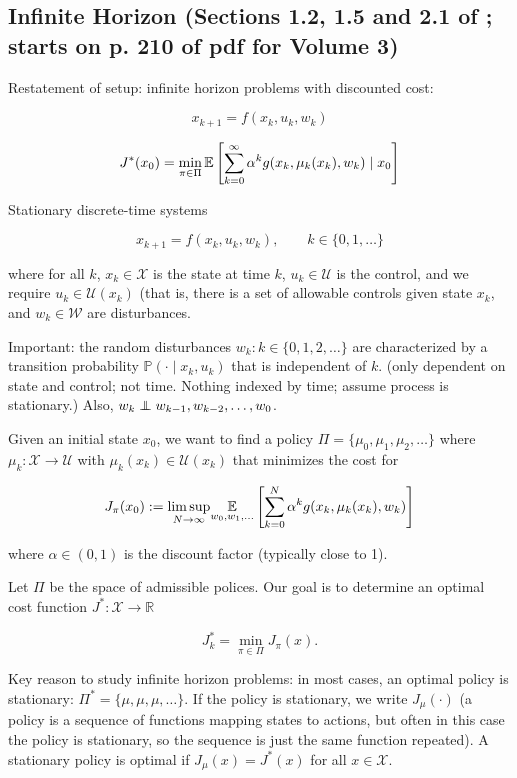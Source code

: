 \subsection{Infinite Horizon (Sections 1.2, 1.5 and 2.1 of \citet{v2_bertsekas2012dynamic}; starts on p. 210 of pdf for Volume 3)}\label{statlearning.inf.horizon}

Restatement of setup: infinite horizon problems with discounted cost:

\[
x_{k+1} = f(x_k, u_k, w_k) 
\]

\[
J^*(x_0) = \min_{\pi \in \Pi} \mathbb{E} \left[ \sum_{k=0}^\infty \alpha^k g(x_k, \mu_k(x_k), w_k)  \mid x_0\right]
\]


Stationary discrete-time systems 

\[
x_{k+1} = f(x_k, u_k, w_k), \qquad k \in \{0, 1, \ldots\}
\]

where for all \(k\), \(x_k \in \mathcal{X}\) is the state at time \(k\), \(u_k \in \mathcal{U}\) is the control, and we require \(u_k \in \mathcal{U}(x_k)\) (that is, there is a set of allowable controls given state \(x_k\), and \(w_k \in \mathcal{W}\) are disturbances.

Important: the random disturbances \(w_k: k \in \{0, 1, 2, \ldots\}\) are characterized by a transition probability \(\mathbb{P}(\cdot \mid x_k, u_k)\) that is independent of \(k\). (only dependent on state and control; not time. Nothing indexed by time; assume process is stationary.) Also, \(w_k \indep w_{k-1}, w_{k-2}, \ldots, w_0\).

Given an initial state \(x_0\), we want to find a policy \(\Pi = \{\mu_0, \mu_1, \mu_2, \ldots \}\) where \(\mu_k : \mathcal{X} \to \mathcal{U}\) with \(\mu_k(x_k) \in \mathcal{U}(x_k)\) that minimizes the cost for

\[
J_\pi(x_0) := \underset{N \to \infty}{ \lim \sup} \underset{w_0, w_1, \ldots}{\mathbb{E}} \left[  \sum_{k=0}^N \alpha^k g(x_k, \mu_k(x_k), w_k) \right]
\]

where \(\alpha \in (0,1) \) is the discount factor (typically close to 1).

Let \(\Pi\) be the space of admissible polices. Our goal is to determine an optimal cost function \(J^*: \mathcal{X} \to \mathbb{R}\)

\[
J_k^* = \min_{\pi \in \Pi} J_\pi(x).
\]

Key reason to study infinite horizon problems: in most cases, an optimal policy is stationary: \(\Pi^* = \{\mu, \mu, \mu, \ldots\}\). If the policy is stationary, we write \(J_\mu(\cdot)\) (a policy is a sequence of functions mapping states to actions, but often in this case the policy is stationary, so the sequence is just the same function repeated). A stationary policy is optimal if \(J_\mu(x) = J^*(x)\) for all \( x \in \mathcal{X}\). 

